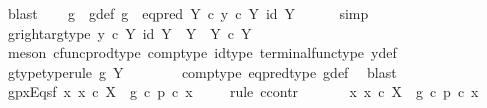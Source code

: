 \begin{isabellebody}
\ blast\isanewline
\ \ \isamarkupfalse%
\ g\ \ g{\isacharunderscore}{\kern0pt}def{\isacharcolon}{\kern0pt}\ {\isachardoublequoteopen}g\ {\isacharequal}{\kern0pt}\ eq{\isacharunderscore}{\kern0pt}pred\ Y\ {\isasymcirc}\isactrlsub c\ {\isasymlangle}y{}\ {\isasymcirc}\isactrlsub c\ {\isasymbeta}\isactrlbsub Y\isactrlesub {\isacharcomma}{\kern0pt}\ id\ Y{\isasymrangle}{\isachardoublequoteclose}\isanewline
\ \ \ \ \isamarkupfalse%
\ simp\isanewline
\ \ \isamarkupfalse%
\ g{\isacharunderscore}{\kern0pt}right{\isacharunderscore}{\kern0pt}arg{\isacharunderscore}{\kern0pt}type{\isacharcolon}{\kern0pt}\ {\isachardoublequoteopen}{\isasymlangle}y{}\ {\isasymcirc}\isactrlsub c\ {\isasymbeta}\isactrlbsub Y\isactrlesub {\isacharcomma}{\kern0pt}\ id\ Y{\isasymrangle}\ {\isacharcolon}{\kern0pt}\ Y\ {\isasymrightarrow}\ Y\ {\isasymtimes}\isactrlsub c\ Y{\isachardoublequoteclose}\isanewline
\ \ \ \ \isamarkupfalse%
\ {\isacharparenleft}{\kern0pt}meson\ cfunc{\isacharunderscore}{\kern0pt}prod{\isacharunderscore}{\kern0pt}type\ comp{\isacharunderscore}{\kern0pt}type\ id{\isacharunderscore}{\kern0pt}type\ terminal{\isacharunderscore}{\kern0pt}func{\isacharunderscore}{\kern0pt}type\ y{\isacharunderscore}{\kern0pt}def{\isacharparenright}{\kern0pt}\isanewline
\ \ \isamarkupfalse%
\ \isamarkupfalse%
\ g{\isacharunderscore}{\kern0pt}type{\isacharbrackleft}{\kern0pt}type{\isacharunderscore}{\kern0pt}rule{\isacharbrackright}{\kern0pt}{\isacharcolon}{\kern0pt}\ {\isachardoublequoteopen}g{\isacharcolon}{\kern0pt}\ Y\ {\isasymrightarrow}\ {\isasymOmega}{\isachardoublequoteclose}\isanewline
\ \ \ \ \isamarkupfalse%
\ comp{\isacharunderscore}{\kern0pt}type\ eq{\isacharunderscore}{\kern0pt}pred{\isacharunderscore}{\kern0pt}type\ g{\isacharunderscore}{\kern0pt}def\ \isamarkupfalse%
\ blast\isanewline
\isanewline
\ \ \isamarkupfalse%
\ gpx{\isacharunderscore}{\kern0pt}Eqs{\isacharunderscore}{\kern0pt}f{\isacharcolon}{\kern0pt}\ {\isachardoublequoteopen}{\isasymforall}x{\isachardot}{\kern0pt}\ x\ {\isasymin}\isactrlsub c\ X\ {\isasymlongrightarrow}\ g\ {\isasymcirc}\isactrlsub c\ p\ {\isasymcirc}\isactrlsub c\ x\ {\isacharequal}{\kern0pt}\ {\isasymf}{\isachardoublequoteclose}\isanewline
\ \ \isamarkupfalse%
{\isacharparenleft}{\kern0pt}rule\ ccontr{\isacharparenright}{\kern0pt}\isanewline
\ \ \ \ \isamarkupfalse%
\ {\isachardoublequoteopen}{\isasymnot}\ {\isacharparenleft}{\kern0pt}{\isasymforall}x{\isachardot}{\kern0pt}\ x\ {\isasymin}\isactrlsub c\ X\ {\isasymlongrightarrow}\ g\ {\isasymcirc}\isactrlsub c\ p\ {\isasymcirc}\isactrlsub c\ x\ {\isacharequal}{\kern0pt}\ {\isasymf}{\isacharparenright}{\kern0pt}{\isachardoublequoteclose}\isanewline

\end{isabellebody}
